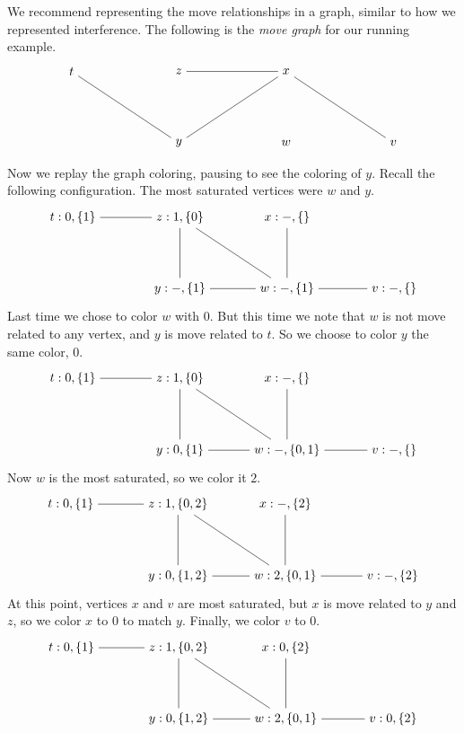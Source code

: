 \documentclass[11pt]{book}
\begin{document}
We recommend representing the move relationships in a graph, similar
to how we represented interference.  The following is the \emph{move
  graph} for our running example.
\[
\begin{tikzpicture}[baseline=(current  bounding  box.center)]
\node (t) at (0,2) {$t$};
\node (z) at (3,2)  {$z$};
\node (x) at (6,2)  {$x$};
\node (y) at (3,0)  {$y$};
\node (w) at (6,0)  {$w$};
\node (v) at (9,0)  {$v$};

\draw (v) to (x);
\draw (x) to (y);
\draw (x) to (z);
\draw (y) to (t);
\end{tikzpicture}
\]

Now we replay the graph coloring, pausing to see the coloring of
$y$. Recall the following configuration. The most saturated vertices
were $w$ and $y$.
\[
\begin{tikzpicture}[baseline=(current  bounding  box.center)]
\node (t1) at (0,2) {$t:0,\{1\}$};
\node (z) at (3,2)  {$z:1,\{0\}$};
\node (x) at (6,2)  {$x:-,\{\}$};
\node (y) at (3,0)  {$y:-,\{1\}$};
\node (w) at (6,0)  {$w:-,\{1\}$};
\node (v) at (9,0)  {$v:-,\{\}$};

\draw (t1) to (z);
\draw (z) to (y);
\draw (z) to (w);
\draw (x) to (w);
\draw (y) to (w);
\draw (v) to (w);
\end{tikzpicture}
\]
%
Last time we chose to color $w$ with $0$. But this time we note that
$w$ is not move related to any vertex, and $y$ is move related to $t$.
So we choose to color $y$ the same color, $0$.
\[
\begin{tikzpicture}[baseline=(current  bounding  box.center)]
\node (t1) at (0,2) {$t:0,\{1\}$};
\node (z) at (3,2)  {$z:1,\{0\}$};
\node (x) at (6,2)  {$x:-,\{\}$};
\node (y) at (3,0)  {$y:0,\{1\}$};
\node (w) at (6,0)  {$w:-,\{0,1\}$};
\node (v) at (9,0)  {$v:-,\{\}$};

\draw (t1) to (z);
\draw (z) to (y);
\draw (z) to (w);
\draw (x) to (w);
\draw (y) to (w);
\draw (v) to (w);
\end{tikzpicture}
\]
Now $w$ is the most saturated, so we color it $2$.
\[
\begin{tikzpicture}[baseline=(current  bounding  box.center)]
\node (t1) at (0,2) {$t:0,\{1\}$};
\node (z) at (3,2)  {$z:1,\{0,2\}$};
\node (x) at (6,2)  {$x:-,\{2\}$};
\node (y) at (3,0)  {$y:0,\{1,2\}$};
\node (w) at (6,0)  {$w:2,\{0,1\}$};
\node (v) at (9,0)  {$v:-,\{2\}$};

\draw (t1) to (z);
\draw (z) to (y);
\draw (z) to (w);
\draw (x) to (w);
\draw (y) to (w);
\draw (v) to (w);
\end{tikzpicture}
\]
At this point, vertices $x$ and $v$ are most saturated,
but $x$ is move related to $y$ and $z$, so we color $x$ to $0$
to match $y$. Finally, we color $v$ to $0$.
\[
\begin{tikzpicture}[baseline=(current  bounding  box.center)]
\node (t) at (0,2) {$t:0,\{1\}$};
\node (z) at (3,2)  {$z:1,\{0,2\}$};
\node (x) at (6,2)  {$x:0,\{2\}$};
\node (y) at (3,0)  {$y:0,\{1,2\}$};
\node (w) at (6,0)  {$w:2,\{0,1\}$};
\node (v) at (9,0)  {$v:0,\{2\}$};

\draw (t) to (z);
\draw (z) to (y);
\draw (z) to (w);
\draw (x) to (w);
\draw (y) to (w);
\draw (v) to (w);
\end{tikzpicture}
\]
\end{document}
